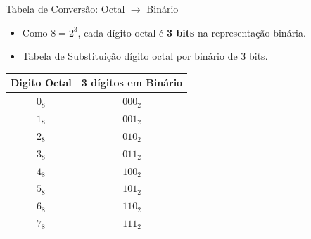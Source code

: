 \begin{frame}{Tabela de Conversão: Octal $\rightarrow$ Binário}
    \begin{itemize}
        \item Como $8 = 2^3$, cada dígito octal é \textbf{3 bits} na representação binária.
        \item Tabela de Substituição dígito octal por binário de 3 bits.
    \end{itemize}

    \begin{table}[]
        \centering
        \Large
        \begin{tabular}{|c|c|}
            \hline
            \textbf{Digito Octal} & \textbf{3 dígitos em Binário} \\
            \hline
            $0_8$                 & $000_2$                       \\ \hline
            $1_8$                 & $001_2$                       \\ \hline
            $2_8$                 & $010_2$                       \\ \hline
            $3_8$                 & $011_2$                       \\ \hline
            $4_8$                 & $100_2$                       \\ \hline
            $5_8$                 & $101_2$                       \\ \hline
            $6_8$                 & $110_2$                       \\ \hline
            $7_8$                 & $111_2$                       \\ \hline
        \end{tabular}
    \end{table}

\end{frame}

